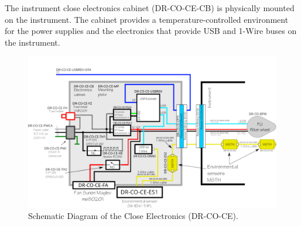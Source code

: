 \documentclass{article}
\begin{document}
The instrument close electronics cabinet (DR-CO-CE-CB) is physically mounted on the instrument. The cabinet provides a temperature-controlled environment for the power supplies and the electronics that provide USB and 1-Wire buses on the instrument.

\begin{figure}[tp]
\begin{center}
\includegraphics[height=0.9\linewidth,angle=90]{figures/electronics-cabinet.pdf}
\end{center}
\caption{Schematic Diagram of the Close Electronics (DR-CO-CE).}
\label{figure:electronics-cabinet}
\end{figure}
\end{document}
